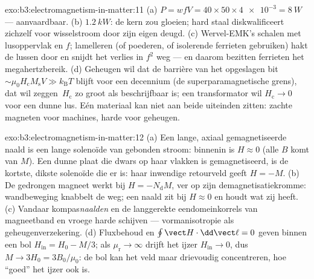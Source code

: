 \begin{solution}{exo:b3:electromagnetism-in-matter:11}
(a) $P = wfV = 40\times50\times\num{4e-3} = \qty{8}{W}$ ---
aanvaardbaar. (b) $\qty{1.2}{kW}$: de kern zou gloeien; hard staal
diskwalificeert zichzelf voor wisselstroom door zijn eigen deugd. (c) Wervel-EMK's
schalen met lusoppervlak en $f$; lamelleren (of poederen, of
isolerende ferrieten gebruiken) hakt de lussen door en snijdt het verlies in $f^2$ weg ---
en daarom bezitten ferrieten het megahertzbereik. (d) Geheugen wil
dat de barrière van het opgeslagen bit $\sim\mu_0H_{\text{c}}M_{\text{s}}V \gg
k_{\text{B}}T$ blijft voor een decennium (de superparamagnetische grens), dat wil zeggen\
$H_{\text{c}}$ zo groot als beschrijfbaar is; een transformator wil
$H_{\text{c}} \to 0$ voor een dunne lus. Eén materiaal kan niet aan
beide uiteinden zitten: zachte magneten voor machines, harde voor geheugen.
\end{solution}

\begin{solution}{exo:b3:electromagnetism-in-matter:12}
(a) Een lange, axiaal gemagnetiseerde naald is een lange solenoïde van gebonden
stroom: binnenin is $H \approx 0$ (alle $B$ komt van $M$). Een dunne
plaat die dwars op haar vlakken is gemagnetiseerd, is de kortste, dikste
solenoïde die er is: haar inwendige retourveld geeft $H = -M$. (b)
De gedrongen magneet werkt bij $H = -N_{\text{d}}M$, ver op zijn
demagnetisatiekromme: wandbeweging knabbelt de  weg; een
naald zit bij $H \approx 0$ en houdt wat zij heeft. (c) Vandaar
kompas\emph{naalden} en de langgerekte eendomeinkorrels van
magneetband en vroege harde schijven --- vormanisotropie als
geheugenverzekering. (d) Fluxbehoud en $\oint\vect H\cdot
\dd\vect\ell = 0$ geven binnen een bol $H_{\text{in}} =
H_0 - M/3$; als $\mu_{\text{r}}\to\infty$ drijft het ijzer
$H_{\text{in}}\to0$, dus $M \to 3H_0 = 3B_0/\mu_0$: de bol kan
het veld maar drievoudig concentreren, hoe ``goed'' het ijzer ook is.
\end{solution}

